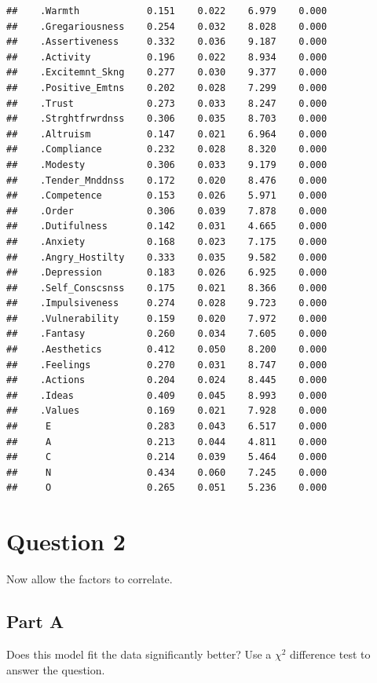 \documentclass{article}\usepackage[]{graphicx}\usepackage[]{color}
\makeatletter
\newenvironment{kframe}{%
 \def\at@end@of@kframe{}%
 \ifinner\ifhmode%
  \def\at@end@of@kframe{\end{minipage}}%
  \begin{minipage}{\columnwidth}%
 \fi\fi%
 \def\FrameCommand##1{\hskip\@totalleftmargin \hskip-\fboxsep
 \colorbox{shadecolor}{##1}\hskip-\fboxsep
     \hskip-\linewidth \hskip-\@totalleftmargin \hskip\columnwidth}%
 \MakeFramed {\advance\hsize-\width
   \@totalleftmargin\z@ \linewidth\hsize
   \@setminipage}}%
 {\par\unskip\endMakeFramed%
 \at@end@of@kframe}
\newenvironment{knitrout}{}{} %
\makeatother
\begin{document}
\begin{knitrout}
\begin{kframe}
\begin{verbatim}
##    .Warmth            0.151    0.022    6.979    0.000
##    .Gregariousness    0.254    0.032    8.028    0.000
##    .Assertiveness     0.332    0.036    9.187    0.000
##    .Activity          0.196    0.022    8.934    0.000
##    .Excitemnt_Skng    0.277    0.030    9.377    0.000
##    .Positive_Emtns    0.202    0.028    7.299    0.000
##    .Trust             0.273    0.033    8.247    0.000
##    .Strghtfrwrdnss    0.306    0.035    8.703    0.000
##    .Altruism          0.147    0.021    6.964    0.000
##    .Compliance        0.232    0.028    8.320    0.000
##    .Modesty           0.306    0.033    9.179    0.000
##    .Tender_Mnddnss    0.172    0.020    8.476    0.000
##    .Competence        0.153    0.026    5.971    0.000
##    .Order             0.306    0.039    7.878    0.000
##    .Dutifulness       0.142    0.031    4.665    0.000
##    .Anxiety           0.168    0.023    7.175    0.000
##    .Angry_Hostilty    0.333    0.035    9.582    0.000
##    .Depression        0.183    0.026    6.925    0.000
##    .Self_Conscsnss    0.175    0.021    8.366    0.000
##    .Impulsiveness     0.274    0.028    9.723    0.000
##    .Vulnerability     0.159    0.020    7.972    0.000
##    .Fantasy           0.260    0.034    7.605    0.000
##    .Aesthetics        0.412    0.050    8.200    0.000
##    .Feelings          0.270    0.031    8.747    0.000
##    .Actions           0.204    0.024    8.445    0.000
##    .Ideas             0.409    0.045    8.993    0.000
##    .Values            0.169    0.021    7.928    0.000
##     E                 0.283    0.043    6.517    0.000
##     A                 0.213    0.044    4.811    0.000
##     C                 0.214    0.039    5.464    0.000
##     N                 0.434    0.060    7.245    0.000
##     O                 0.265    0.051    5.236    0.000
\end{verbatim}
\end{kframe}
\end{knitrout}


\section{Question 2}
Now allow the factors to correlate.  

\subsection{Part A}
Does this model fit the data significantly better? Use a $\chi^2$ difference test to answer the question.
\end{document}

